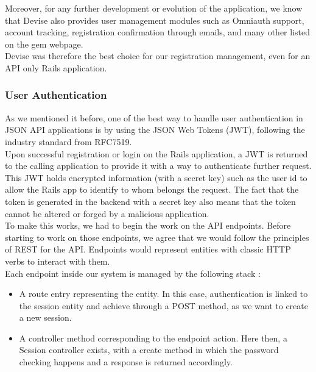 \documentclass{eplmastersthesis}
\begin{document}
          Moreover, for any further development or evolution of the application,
          we know that Devise also provides user management modules such as
          Omniauth support, account tracking, registration confirmation
          through emails, and many other listed on the gem webpage.\\

          Devise was therefore the best choice for our registration management,
          even for an API only Rails application.

        \subsubsection{User Authentication}

          As we mentioned it before, one of the best way to handle user
          authentication in JSON API applications is by using the JSON Web
          Tokens (JWT), following the industry standard from RFC7519.\\

          Upon successful registration or login on the Rails application, a
          JWT is returned to the calling application to provide it with a way
          to authenticate further request. This JWT holds encrypted
          information (with a secret key) such as the user id to allow the Rails
          app to identify to whom belongs the request. The fact that the token
          is generated in the backend with a secret key also means that the
          token cannot be altered or forged by a malicious application.\\

          To make this works, we had to begin the work on the API endpoints.
          Before starting to work on those endpoints, we agree that we would
          follow the principles of REST \cite{rest} for the API. Endpoints would
          represent entities with classic HTTP verbs to interact with them.\\

          Each endpoint inside our system is managed by the following stack :

          \begin{itemize}
            \item A route entry representing the entity. In this case,
            authentication is linked to the session entity and achieve through
            a POST method, as we want to create a new session.
            \item A controller method corresponding to the endpoint action.
            Here then, a Session controller exists, with a create method in
            which the password checking happens and a response is returned
            accordingly.
          \end{itemize}
\end{document}
